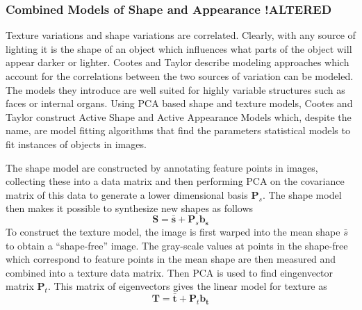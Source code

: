 \documentclass[11pt,a4paper]{report}
\begin{document}

\subsubsection{Combined Models of Shape and Appearance !ALTERED}
Texture variations and shape variations are correlated. Clearly, with any source of
lighting it is the shape of an object which influences what parts of the object
will appear darker or lighter. Cootes and Taylor \cite{activeApp04} describe modeling approaches
which account for the correlations between the two sources of
variation can be modeled. The models they introduce are well suited for highly
variable structures such as faces or internal organs. Using PCA based shape and
texture models, Cootes and Taylor construct Active
Shape and Active Appearance Models which, despite the name, are model fitting algorithms that find the parameters statistical models to fit instances of objects in images.

The shape model are constructed by annotating feature points in
images, collecting these into a data matrix and then performing PCA on the
covariance matrix of this data to generate a lower dimensional basis
$\mathbf{P}_s$. The shape model then makes it possible to synthesize new shapes
as follows
\begin{equation}\label{eq:shape}
\mathbf{S} = \mathbf{\bar{s}} + \mathbf{P}_s\mathbf{b_s}
\end{equation}
To construct the texture model, the image is first warped into the mean shape
$\bar{s}$ to obtain a ``shape-free'' image. The gray-scale values at points in
the shape-free which correspond to feature points in the mean shape are then
measured and combined into a texture data matrix. Then PCA is used to find
eingenvector matrix $\mathbf{P}_t$. This matrix of eigenvectors gives the
linear model for texture as
\begin{equation}\label{eq:text}
\mathbf{T} = \mathbf{\bar{t}} + \mathbf{P}_t\mathbf{b_t}
\end{equation}
\end{document}
